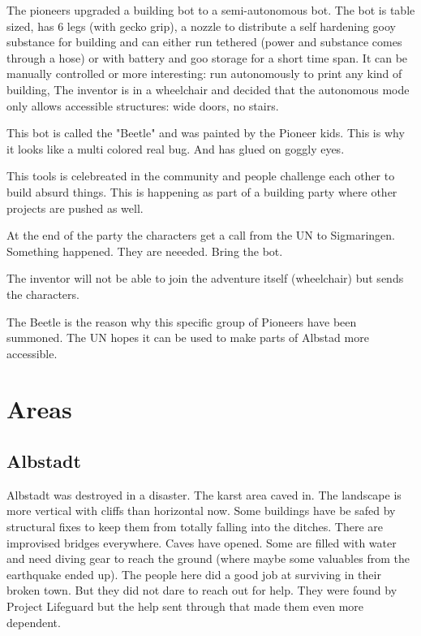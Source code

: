 The pioneers upgraded a building bot to a semi-autonomous bot. The bot is table sized, has 6 legs (with gecko grip), a nozzle to distribute a self hardening gooy substance for building and can either run tethered (power and substance comes through a hose) or with battery and goo storage for a short time span. It can be manually controlled or more interesting: run autonomously to print any kind of building, The inventor is in a wheelchair and decided that the autonomous mode only allows accessible structures: wide doors, no stairs.

This bot is called the "Beetle" and was painted by the Pioneer kids. This is why it looks like a multi colored real bug. And has glued on goggly eyes.

This tools is celebreated in the community and people challenge each other to build absurd things. This is happening as part of a building party where other projects are pushed as well.
 
At the end of the party the characters get a call from the UN to Sigmaringen. Something happened. They are neeeded. Bring the bot.

The inventor will not be able to join the adventure itself (wheelchair) but sends the characters.

The Beetle is the reason why this specific group of Pioneers have been summoned. The UN hopes it can be used to make parts of Albstad more accessible.

\section{Areas}

\subsection{Albstadt}

Albstadt was destroyed in a disaster. The karst area caved in. The landscape is more vertical with cliffs than horizontal now. Some buildings have be safed by structural fixes to keep them from totally falling into the ditches. There are improvised bridges everywhere. Caves have opened. Some are filled with water and need diving gear to reach the ground (where maybe some valuables from the earthquake ended up).
The people here did a good job at surviving in their broken town. But they did not dare to reach out for help. They were found by Project Lifeguard but the help sent through that made them even more dependent.




